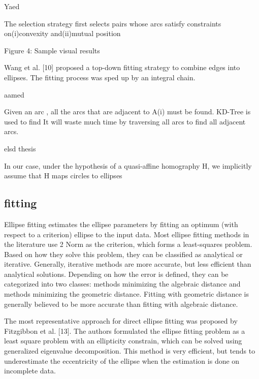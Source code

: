 \documentclass[a4paper]{report}
\begin{document}
Yaed

The selection strategy first selects pairs whose arcs satisfy constraints on(i)convexity and(ii)mutual position

Figure 4: Sample visual results


Wang et al. [10] proposed a top-down fitting strategy to combine edges into
ellipses. The fitting process was sped up by an integral
chain.

aamed



Given an arc , all the arcs that are adjacent to A(i) must be found. KD-Tree is used to find
It will waste much
time by traversing all arcs to find all adjacent arcs.

elsd thesis


In our case, under the hypothesis of a
quasi-affine homography H, we implicitly assume that H maps circles to ellipses




\subsection{fitting}
Ellipse fitting estimates the ellipse parameters by fitting an optimum (with respect to a criterion) ellipse to the input data.
Most ellipse fitting methods in the literature use 2 Norm as the criterion, which forms a least-squares problem.
Based on how they solve this problem, they can be classified as analytical or iterative. Generally, iterative methods are more accurate, but less efficient than analytical solutions.
Depending on how the error is defined, they can be categorized into two classes: methods minimizing the algebraic distance and methods minimizing the geometric distance. Fitting with geometric distance is generally believed to be more accurate than fitting with algebraic distance.


The most representative approach for direct ellipse fitting was proposed by Fitzgibbon et al. [13]. The authors formulated the ellipse fitting problem as a least square problem with an ellipticity constrain, which can be solved using generalized eigenvalue decomposition. This method is very efficient, but tends to underestimate the eccentricity of the ellipse when the estimation is
done on incomplete data.
\end{document}
